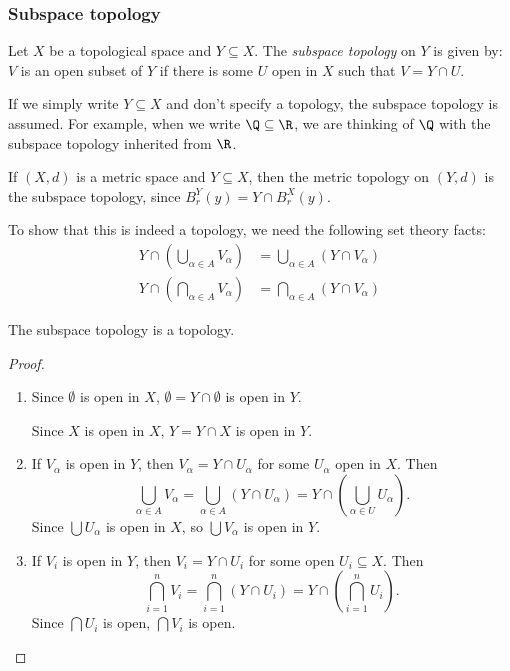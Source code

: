\documentclass[a4paper]{article}
\begin{document}
\subsubsection{Subspace topology}
\begin{defi}
  Let $X$ be a topological space and $Y\subseteq X$. The \emph{subspace topology} on $Y$ is given by: $V$ is an open subset of $Y$ if there is some $U$ open in $X$ such that $V = Y\cap U$.
\end{defi}
If we simply write $Y\subseteq X$ and don't specify a topology, the subspace topology is assumed. For example, when we write $\Q\subseteq \R$, we are thinking of $\Q$ with the subspace topology inherited from $\R$.

\begin{eg}
  If $(X, d)$ is a metric space and $Y\subseteq X$, then the metric topology on $(Y, d)$ is the subspace topology, since $B_r^Y(y) = Y\cap B_r^X(y)$.
\end{eg}

To show that this is indeed a topology, we need the following set theory facts:
\begin{align*}
  Y\cap \left(\bigcup_{\alpha \in A}V_\alpha\right) &= \bigcup_{\alpha \in A}\left(Y\cap V_\alpha\right)\\
  Y\cap \left(\bigcap_{\alpha\in A}V_\alpha\right) &= \bigcap_{\alpha\in A}(Y\cap V_\alpha)
\end{align*}

\begin{prop}
  The subspace topology is a topology.
\end{prop}

\begin{proof}\leavevmode
  \begin{enumerate}
    \item Since $\emptyset$ is open in $X$, $\emptyset = Y\cap \emptyset$ is open in $Y$.

      Since $X$ is open in $X$, $Y = Y\cap X$ is open in $Y$.
    \item If $V_\alpha$ is open in $Y$, then $V_\alpha = Y\cap U_\alpha$ for some $U_\alpha$ open in $X$. Then
      \[
        \bigcup_{\alpha\in A}V_\alpha = \bigcup_{\alpha\in A}\left(Y\cap U_\alpha\right) = Y\cap \left(\bigcup_{\alpha\in U}U_\alpha\right).
      \]
      Since $\bigcup U_\alpha$ is open in $X$, so $\bigcup V_\alpha$ is open in $Y$.
    \item If $V_i$ is open in $Y$, then $V_i = Y\cap U_i$ for some open $U_i\subseteq X$. Then
      \[
        \bigcap_{i = 1}^n V_i = \bigcap_{i = 1}^n \left(Y\cap U_i\right) = Y\cap \left(\bigcap_{i = 1}^n U_i\right).
      \]
      Since $\bigcap U_i$ is open, $\bigcap V_i$ is open.\qedhere
  \end{enumerate}
\end{proof}
\end{document}
